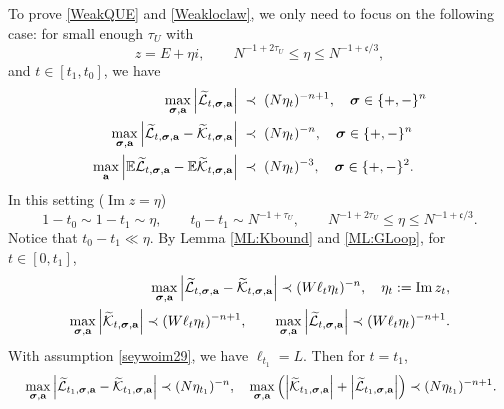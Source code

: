 \documentclass[10pt,reqno]{article}
\DeclareMathOperator{\im}{{\mathrm{Im}}}
\theoremstyle{plain} %
\theoremstyle{remark}
\numberwithin{equation}{section}
\begin{document}
To prove  \eqref{WeakQUE} and \eqref{Weakloclaw}, we only need to focus on the following case: for small enough $\tau_U$ with 
$$
z=E+\eta i, \quad \quad  N^{-1+2\tau_U }\le \eta\le N^{-1+\mathfrak c/3}, 
$$
and $t\in [t_1,t_0]$,   we have 
\begin{align} \label{WLKNE1}
\max_{\boldsymbol{\sigma}, \textbf{a}}\left|{\cal \widetilde{L}}_{t , \boldsymbol{\sigma}, \textbf{a}} \right|&\;\prec\; (N\eta_{t })^{-n+1}, \quad \boldsymbol{\sigma}\in\{+,-\}^n
\\ \label{WLKNE2}
\max_{\boldsymbol{\sigma}, \textbf{a}}\left|{\cal \widetilde{L}}_{t , \boldsymbol{\sigma}, \textbf{a}}-{\cal \widetilde{K}}_{t , \boldsymbol{\sigma}, \textbf{a}}\right|&\;\prec\; (N\eta_{t })^{-n}, \quad \boldsymbol{\sigma}\in\{+,-\}^n
\\ \label{WLKNE3}
\max_{\textbf{a}}\left|\mathbb E {\cal \widetilde{L}}_{t , \boldsymbol{\sigma}, \textbf{a}}-\mathbb E{\cal \widetilde{K}}_{t , \boldsymbol{\sigma}, \textbf{a}}\right|&\;\prec\; (N\eta_{t })^{-3},\quad  \boldsymbol{\sigma}\in\{+,-\}^2.
\end{align} 
In this setting ($\im z= \eta$) 
\begin{equation}\label{seywoim29}
     1-t_0\sim 1-t_1\sim \eta,\quad \quad   t_0-t_1\sim N^{-1+ \tau_U},\quad\quad N^{-1+2\tau_U }\le \eta\le N^{-1+\mathfrak c/3}.
\end{equation}
 Notice that $t_0-t_1 \ll \eta$. By Lemma \ref{ML:Kbound} and \ref{ML:GLoop}, for $t\in [0,t_1]$, 
\begin{align}
 \max_{\boldsymbol{\sigma}, \textbf{a}}\left|{\cal \widetilde{L}}_{t, \boldsymbol{\sigma}, \textbf{a}}-{\cal \widetilde{K}}_{t, \boldsymbol{\sigma}, \textbf{a}}\right|\prec (W\ell_t\eta_t)^{-n},\quad \eta_t:=\im z_t,  %
\\\nonumber
\max_{\boldsymbol{\sigma}, \textbf{a}}\left|{\cal \widetilde{K}}_{t, \boldsymbol{\sigma}, \textbf{a}} \right| \prec (W\ell_t\eta_t)^{-n+1},\quad \quad \max_{\boldsymbol{\sigma}, \textbf{a}}\left|{\cal \widetilde{L}}_{t, \boldsymbol{\sigma}, \textbf{a}} \right|\prec (W\ell_t\eta_t)^{-n+1}. %
\end{align} 
With assumption \eqref{seywoim29},  we have $\ell_{t_1}=L$.  
Then for $t=t_1$,
\begin{align}\label{uwi2oo1}
\quad & \max_{\boldsymbol{\sigma}, \textbf{a}}\left|{\cal \widetilde{L}}_{t_1, \boldsymbol{\sigma}, \textbf{a}}-{\cal \widetilde{K}}_{t_1, \boldsymbol{\sigma}, \textbf{a}}\right|\prec (N\eta_{t_1})^{-n}, 
\quad \max_{\boldsymbol{\sigma}, \textbf{a}}\left(\left|{\cal \widetilde{K}}_{t_1, \boldsymbol{\sigma}, \textbf{a}} \right| +\left|{\cal \widetilde{L}}_{t_1, \boldsymbol{\sigma}, \textbf{a}} \right|\right)\prec (N\eta_{t_1})^{-n+1}.  \end{align} 
\end{document}

